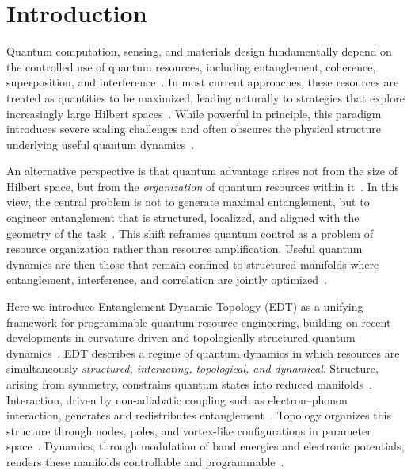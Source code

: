 \section{Introduction}

Quantum computation, sensing, and materials design fundamentally depend on the controlled use of quantum resources, including entanglement, coherence, superposition, and interference~\cite{NielsenChuang,Horodecki2009,Streltsov2017}. In most current approaches, these resources are treated as quantities to be maximized, leading naturally to strategies that explore increasingly large Hilbert spaces~\cite{Preskill2018,Arute2019}. While powerful in principle, this paradigm introduces severe scaling challenges and often obscures the physical structure underlying useful quantum dynamics~\cite{Eisert2010,Altman2015}.

An alternative perspective is that quantum advantage arises not from the size of Hilbert space, but from the \emph{organization} of quantum resources within it~\cite{Amico2008,Swingle2018}. In this view, the central problem is not to generate maximal entanglement, but to engineer entanglement that is structured, localized, and aligned with the geometry of the task~\cite{Verstraete2008,Orus2014}. This shift reframes quantum control as a problem of resource organization rather than resource amplification. Useful quantum dynamics are then those that remain confined to structured manifolds where entanglement, interference, and correlation are jointly optimized~\cite{KimHuse2013,Choi2016}.

Here we introduce Entanglement-Dynamic Topology (EDT) as a unifying framework for programmable quantum resource engineering, building on recent developments in curvature-driven and topologically structured quantum dynamics~\cite{Hu2024_ACP,Hu2025_APQ,Hu2026_JPCM}. EDT describes a regime of quantum dynamics in which resources are simultaneously \emph{structured, interacting, topological, and dynamical}. Structure, arising from symmetry, constrains quantum states into reduced manifolds~\cite{Wigner1959,Georgi1999}. Interaction, driven by non-adiabatic coupling such as electron--phonon interaction, generates and redistributes entanglement~\cite{Mead1979,Yarkony1996}. Topology organizes this structure through nodes, poles, and vortex-like configurations in parameter space~\cite{Berry1984,Xiao2010}. Dynamics, through modulation of band energies and electronic potentials, renders these manifolds controllable and programmable~\cite{Bukov2015,Eckardt2017}.


